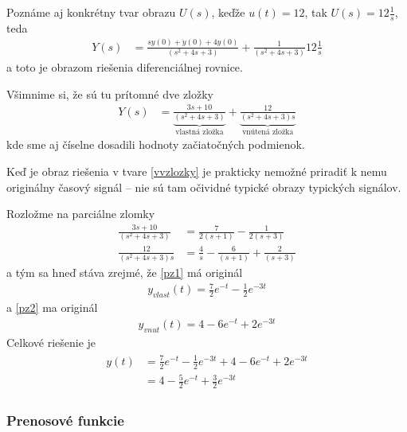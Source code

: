 \documentclass[a4paper, 10pt, ]{article}
\begin{document}
Poznáme aj konkrétny tvar obrazu $U(s)$, keďže $u(t) = 12$, tak $U(s) = 12 \frac{1}{s}$, teda
\begin{align}
    Y(s) &= \frac{sy(0) +  \dot y(0) + 4y(0)}{\left( s^2   + 4s  + 3\right)} + \frac{1}{\left( s^2   + 4s  + 3\right)} 12 \frac{1}{s}
\end{align}
a toto je obrazom riešenia diferenciálnej rovnice.

Všimnime si, že sú tu prítomné dve zložky
\begin{align} \label{vvzlozky}
    Y(s)
    &=
    \underbrace{
    \frac{3s + 10}{\left( s^2   + 4s  + 3\right)}
    }_{\text{vlastná zložka}}
    +
    \underbrace{
    \frac{12}{\left( s^2   + 4s  + 3\right) s}
    }_{\text{vnútená zložka}}
\end{align}
kde sme aj číselne dosadili hodnoty začiatočných podmienok.

Keď je obraz riešenia v tvare \eqref{vvzlozky} je prakticky nemožné priradiť k nemu originálny časový signál -- nie sú tam očividné typické obrazy typických signálov.

Rozložme na parciálne zlomky
\begin{align}
    \frac{3s + 10}{\left( s^2   + 4s  + 3\right)} &= \frac{7}{2(s+1)} - \frac{1}{2(s+3)} \label{pz1} \\
    \frac{12}{\left( s^2   + 4s  + 3\right) s} &= \frac{4}{s} - \frac{6}{(s+1)} + \frac{2}{(s+3)} \label{pz2}
\end{align}
a tým sa hneď stáva zrejmé, že \eqref{pz1} má originál
\begin{align}
    y_{vlast}(t) = \frac{7}{2} e^{-t} - \frac{1}{2} e^{-3t}
\end{align}
a \eqref{pz2} ma originál
\begin{align}
    y_{vnut}(t) = 4 - 6 e^{-t} + 2 e^{-3t}
\end{align}
Celkové riešenie je
\begin{align}
    \begin{aligned}
        y(t) &= \frac{7}{2} e^{-t} - \frac{1}{2} e^{-3t} +  4 - 6 e^{-t} + 2 e^{-3t} \\
        &= 4 - \frac{5}{2} e^{-t} + \frac{3}{2} e^{-3t}
    \end{aligned}
\end{align}



\subsubsection{Prenosové funkcie}
\end{document}
